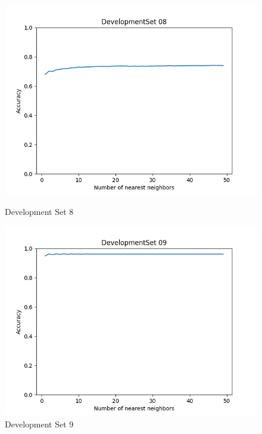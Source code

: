 \documentclass{article}
\begin{document}
\begin{figure}[H]
	\centering
	\begin{minipage}{.33\textwidth}
			\centering
			\includegraphics[width=1\linewidth]{../KNN_DevelopmentSet 08.png}
			\caption{Development Set 8}
	\end{minipage}\hfill
        \centering
	\begin{minipage}{.33\textwidth}
			\centering
			\includegraphics[width=1\linewidth]{../KNN_DevelopmentSet 09.png}
			\caption{Development Set 9}
	\end{minipage}\hfill
        \centering
	\begin{minipage}{.33\textwidth}
			\centering

\end{minipage}
\end{figure}
\end{document}

